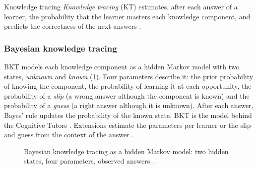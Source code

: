\begin{definitionbox}{Knowledge tracing}
\emph{Knowledge tracing} (KT) estimates, after each answer of a learner,
the probability that the learner masters each knowledge component, and
predicts the correctness of the next answers \cite{corbett1994kt,abdelrahman2023}.
\end{definitionbox}

\subsubsection{Bayesian knowledge tracing}
BKT \cite{corbett1994kt} models
each knowledge component as a hidden Markov model with two states,
\emph{unknown} and \emph{known} (\cref{fig-bkt}). Four parameters describe
it: the prior probability of knowing the component, the probability of
learning it at each opportunity, the probability of a \emph{slip} (a wrong
answer although the component is known) and the probability of a
\emph{guess} (a right answer although it is unknown). After each answer,
Bayes' rule updates the probability of the known state. BKT is the model
behind the Cognitive Tutors \cite{anderson1995,ritter2007}. Extensions
estimate the parameters per learner \cite{pardos2010} or the slip and guess
from the context of the answer \cite{baker2008}.

\begin{figure}[htbp]
\centering
{}
\caption[Bayesian knowledge tracing]{Bayesian knowledge tracing as a hidden
Markov model: two hidden states, four parameters, observed answers
\cite{corbett1994kt}.}
\label{fig-bkt}
\end{figure}

